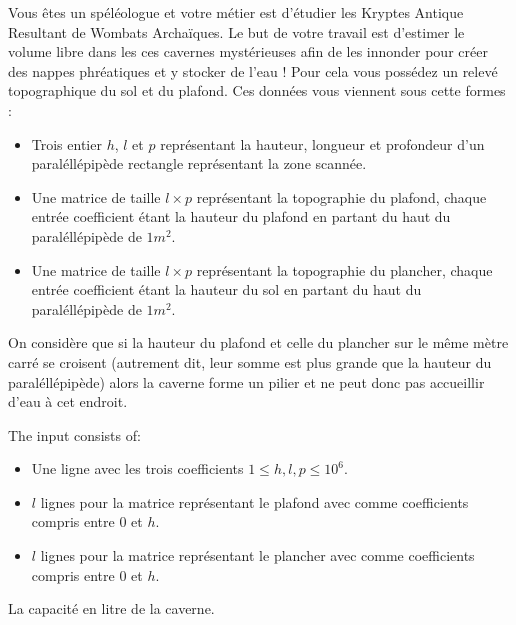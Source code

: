 

\newcommand{\maxa}{123456789}

Vous êtes un spéléologue et votre métier est d'étudier les Kryptes Antique Resultant de Wombats Archaïques. Le but de votre travail est d'estimer le volume libre dans les ces cavernes mystérieuses afin de les innonder pour créer des nappes phréatiques et y stocker de l'eau ! Pour cela vous possédez un relevé topographique du sol et du plafond. Ces données vous viennent sous cette formes :
\begin{itemize}
\item Trois entier $h$, $l$ et $p$ représentant la hauteur, longueur et profondeur d'un paraléllépipède rectangle représentant la zone scannée.
\item Une matrice de taille $l\times p$ représentant la topographie du plafond, chaque entrée coefficient étant la hauteur du plafond en partant du haut du paraléllépipède de $1m^2$.
\item Une matrice de taille $l\times p$ représentant la topographie du plancher, chaque entrée coefficient étant la hauteur du sol en partant du haut du paraléllépipède de $1m^2$.
\end{itemize}

On considère que si la hauteur du plafond et celle du plancher sur le même mètre carré se croisent (autrement dit, leur somme est plus grande que la hauteur du paraléllépipède) alors la caverne forme un pilier et ne peut donc pas accueillir d'eau à cet endroit.

\begin{Input}
    The input consists of:
    \begin{itemize}
        \item Une ligne avec les trois coefficients $1 \leq h, l, p \leq 10^6$.
        \item $l$ lignes pour la matrice représentant le plafond avec comme coefficients compris entre $0$ et $h$.
        \item $l$ lignes pour la matrice représentant le plancher avec comme coefficients compris entre $0$ et $h$.
    \end{itemize}
\end{Input}

\begin{Output}
    La capacité en litre de la caverne.
\end{Output}
